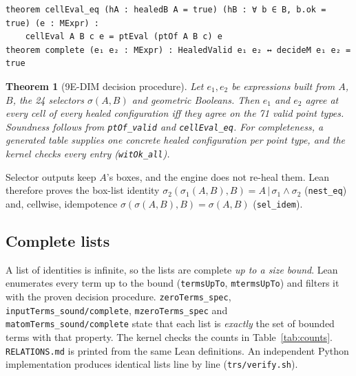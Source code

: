 \documentclass[11pt]{article}
\newtheorem{theorem}{Theorem}
\begin{document}
\begin{lstlisting}[language=Lean]
theorem cellEval_eq (hA : healedB A = true) (hB : ∀ b ∈ B, b.ok = true) (e : MExpr) :
    cellEval A B c e = ptEval (ptOf A B c) e
theorem complete (e₁ e₂ : MExpr) : HealedValid e₁ e₂ ↔ decideM e₁ e₂ = true
\end{lstlisting}
\begin{theorem}[9E-DIM decision procedure]\label{thm:complete}
Let $e_1,e_2$ be expressions built from $A$, $B$, the 24 selectors $\sigma(A,B)$ and geometric Booleans. Then $e_1$ and $e_2$ agree at every cell of every healed configuration iff they agree on the 71 valid point types. Soundness follows from \texttt{ptOf\_valid} and \texttt{cellEval\_eq}. For completeness, a generated table supplies one concrete healed configuration per point type, and the kernel checks every entry (\texttt{witOk\_all}).
\end{theorem}
Selector outputs keep $A$'s boxes, and the engine does not re-heal them. Lean therefore proves the box-list identity $\sigma_2(\sigma_1(A,B),B) = A\,|\,\sigma_1\wedge\sigma_2$ (\texttt{nest\_eq}) and, cellwise, idempotence $\sigma(\sigma(A,B),B)=\sigma(A,B)$ (\texttt{sel\_idem}).

\subsection{Complete lists}
A list of identities is infinite, so the lists are complete \emph{up to a size bound}. Lean enumerates every term up to the bound (\texttt{termsUpTo}, \texttt{mtermsUpTo}) and filters it with the proven decision procedure. \texttt{zeroTerms\_spec}, \texttt{inputTerms\_sound/complete}, \texttt{mzeroTerms\_spec} and \texttt{matomTerms\_sound/complete} state that each list is \emph{exactly} the set of bounded terms with that property. The kernel checks the counts in Table~\ref{tab:counts}. \texttt{RELATIONS.md} is printed from the same Lean definitions. An independent Python implementation produces identical lists line by line (\texttt{trs/verify.sh}).
\end{document}
